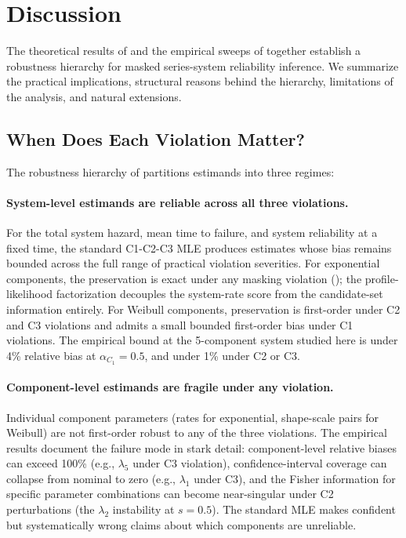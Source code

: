 \section{Discussion}
\label{sec:discussion}

The theoretical results of  and the empirical sweeps of
 together establish a robustness hierarchy for
masked series-system reliability inference. We summarize the practical
implications, structural reasons behind the hierarchy, limitations of the
analysis, and natural extensions.

\subsection{When Does Each Violation Matter?}
\label{sec:when-matter}

The robustness hierarchy of  partitions estimands into
three regimes:

\paragraph{System-level estimands are reliable across all three violations.}
For the total system hazard, mean time to failure, and system reliability
at a fixed time, the standard C1-C2-C3 MLE produces estimates whose bias
remains bounded across the full range of practical violation severities.
For exponential components, the preservation is exact under any masking
violation (); the profile-likelihood
factorization decouples the system-rate score from the candidate-set
information entirely. For Weibull components, preservation is first-order
under C2 and C3 violations and admits a small bounded first-order bias
under C1 violations. The empirical bound at the 5-component system
studied here is under 4\% relative bias at $\alpha_{C_1} = 0.5$, and
under 1\% under C2 or C3.

\paragraph{Component-level estimands are fragile under any violation.}
Individual component parameters (rates for exponential, shape-scale pairs
for Weibull) are not first-order robust to any of the three violations.
The empirical results document the failure mode in stark detail:
component-level relative biases can exceed 100\% (e.g., $\lambda_5$ under
C3 violation), confidence-interval coverage can collapse from nominal to
zero (e.g., $\lambda_1$ under C3), and the Fisher information for
specific parameter combinations can become near-singular under C2
perturbations (the $\lambda_2$ instability at $s = 0.5$). The standard
MLE makes confident but systematically wrong claims about which
components are unreliable.

